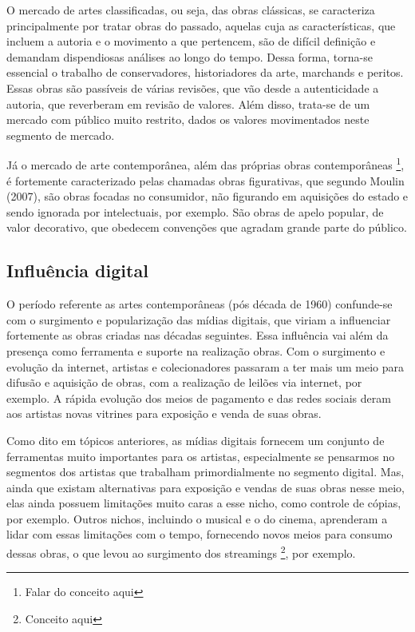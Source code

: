 O mercado de artes classificadas, ou seja, das obras clássicas, se caracteriza principalmente por tratar obras do passado, aquelas cuja as características, que incluem a autoria e o movimento a que pertencem, são de difícil definição e demandam dispendiosas análises ao longo do tempo. Dessa forma, torna-se essencial o trabalho de conservadores, historiadores da arte, marchands e peritos. Essas obras são passíveis de várias revisões, que vão desde a autenticidade a autoria, que reverberam em revisão de valores. Além disso, trata-se de um mercado com público muito restrito, dados os valores movimentados neste segmento de mercado. 

Já o mercado de arte contemporânea, além das próprias obras contemporâneas \footnote{Falar do conceito aqui}, é fortemente caracterizado pelas chamadas obras figurativas, que segundo Moulin (2007), são obras focadas no consumidor, não figurando em aquisições do estado e sendo ignorada por intelectuais, por exemplo. São obras de apelo popular, de valor decorativo, que obedecem convenções que agradam grande parte do público. 

\subsection{Influência digital}
\label{subsec: influência digital}

O período referente as artes contemporâneas (pós década de 1960) confunde-se com o surgimento e popularização das mídias digitais, que viriam a influenciar fortemente as obras criadas nas décadas seguintes. Essa influência vai além da presença como ferramenta e suporte na realização obras. Com o surgimento e evolução da internet, artistas e colecionadores passaram a ter mais um meio para difusão e aquisição de obras, com a realização de leilões via internet, por exemplo. A rápida evolução dos meios de pagamento e das redes sociais deram aos artistas novas vitrines para exposição e venda de suas obras. 

Como dito em tópicos anteriores, as mídias digitais fornecem um conjunto de ferramentas muito importantes para os artistas, especialmente se pensarmos no segmentos dos artistas que trabalham primordialmente no segmento digital. Mas, ainda que existam alternativas para exposição e vendas de suas obras nesse meio, elas ainda possuem limitações muito caras a esse nicho, como controle de cópias, por exemplo. Outros nichos, incluindo o musical e o do cinema, aprenderam a lidar com essas limitações com o tempo, fornecendo novos meios para consumo dessas obras, o que levou ao surgimento dos streamings \footnote{Conceito aqui}, por exemplo.

